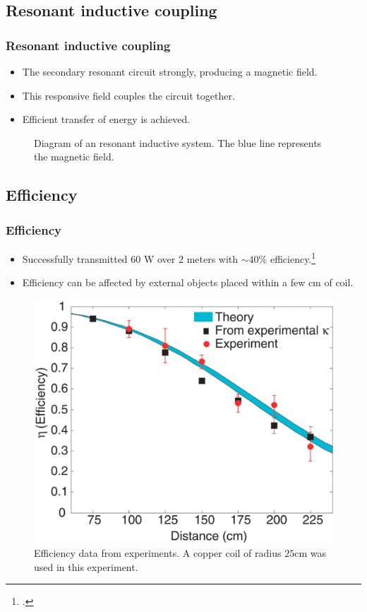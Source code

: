 \documentclass{beamer}
\begin{document}
\subsection{Resonant inductive coupling}
\begin{frame}
  \frametitle{Resonant inductive coupling}
  \begin{itemize}
    \item The secondary resonant circuit strongly, producing a magnetic field.
    \item This responsive field couples the circuit together.
    \item Efficient transfer of energy is achieved.
  \end{itemize}
  \begin{figure}
    
    \caption{Diagram of an resonant inductive system.
    The blue line represents the magnetic field.}
  \end{figure}
\end{frame}

\subsection{Efficiency}
\begin{frame}
  \frametitle{Efficiency}
  \begin{itemize}
    \item Successfully transmitted $60$ W over $2$ meters with $\sim40\%$ efficiency.\footcite{StrongCouple}
    \item Efficiency can be affected by external objects placed within a few cm of coil.
  \end{itemize}
  \begin{figure}
    \includegraphics[scale=0.1]{images/Experimental.jpg}
    \caption{Efficiency data from experiments.
    A copper coil of radius $25$cm was used in this experiment. \textcite{StrongCouple}}
  \end{figure}
\end{frame}
\end{document}
